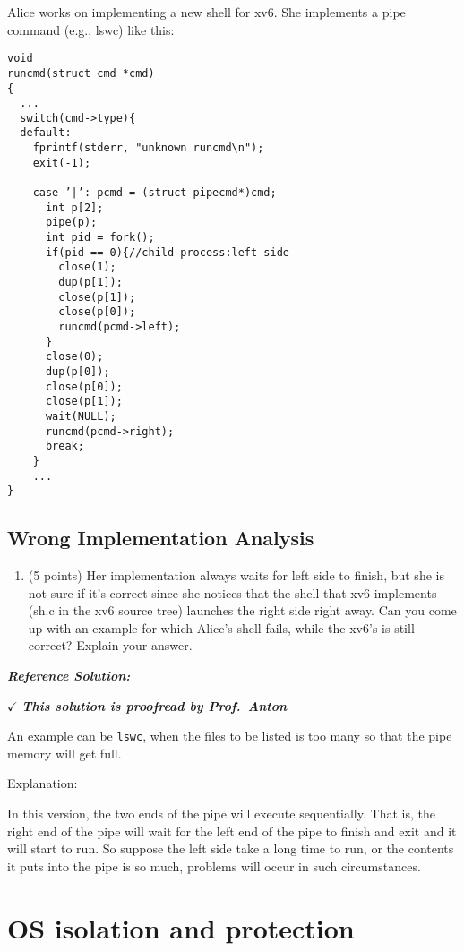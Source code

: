 \documentclass[]{article}
\providecommand{\tightlist}{%
  \setlength{\itemsep}{0pt}\setlength{\parskip}{0pt}}
\begin{document}
Alice works on implementing a new shell for xv6. She implements a pipe
command (e.g., ls\textbar{}wc) like this:

\begin{verbatim}
void
runcmd(struct cmd *cmd)
{
  ...
  switch(cmd->type){
  default:
    fprintf(stderr, "unknown runcmd\n");
    exit(-1);
    
    case ’|’: pcmd = (struct pipecmd*)cmd;
      int p[2];
      pipe(p);
      int pid = fork();
      if(pid == 0){//child process:left side
        close(1);
        dup(p[1]);
        close(p[1]);
        close(p[0]);
        runcmd(pcmd->left);
      }
      close(0);
      dup(p[0]);
      close(p[0]);
      close(p[1]);
      wait(NULL);
      runcmd(pcmd->right);
      break;
    }
    ...
}
\end{verbatim}

\hypertarget{wrong-implementation-analysis}{%
\subsection{Wrong Implementation
Analysis}\label{wrong-implementation-analysis}}

\begin{enumerate}
\def\labelenumi{(\alph{enumi})}
\tightlist
\item
  (5 points) Her implementation always waits for left side to finish,
  but she is not sure if it's correct since she notices that the shell
  that xv6 implements (sh.c in the xv6 source tree) launches the right
  side right away. Can you come up with an example for which Alice's
  shell fails, while the xv6's is still correct? Explain your answer.
\end{enumerate}

\textbf{\emph{Reference Solution:}}

\(\checkmark\) \textbf{\emph{This solution is proofread by Prof.~Anton}}

An example can be \texttt{ls\textbar{}wc}, when the files to be listed
is too many so that the pipe memory will get full.

Explanation:

In this version, the two ends of the pipe will execute sequentially.
That is, the right end of the pipe will wait for the left end of the
pipe to finish and exit and it will start to run. So suppose the left
side take a long time to run, or the contents it puts into the pipe is
so much, problems will occur in such circumstances.

\hypertarget{os-isolation-and-protection}{%
\section{OS isolation and
protection}\label{os-isolation-and-protection}}
\end{document}
